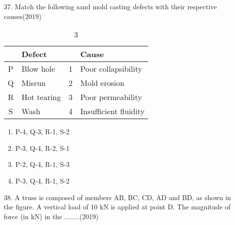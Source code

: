 \documentclass[journal]{IEEEtran}
\begin{document}
\begin{enumerate}
\begin{enumerate}[label=(\Alph*)]
    \end{enumerate}
    \item[37.] Match the following sand mold casting defects with their respective causes\hfill (2019)
    \begin{table}[!ht]
        \centering
        \begin{tabular}{|c|l|c|l|}
            \hline
            \textbf{} & \textbf{Defect} & \textbf{} & \textbf{Cause} \\
            \hline
            P & Blow hole & 1 & Poor collapsibility \\
            Q & Misrun & 2 & Mold erosion \\
            R & Hot tearing & 3 & Poor permeability \\
            S & Wash & 4 & Insufficient fluidity \\
            \hline
        \end{tabular} %
        \caption{3}
    \end{table}
    \begin{enumerate}[label=(\Alph*)]
        \item P-4, Q-3, R-1, S-2
        \item P-3, Q-4, R-2, S-1
        \item P-2, Q-4, R-1, S-3
        \item P-3, Q-4, R-1, S-2
    \end{enumerate}
    \item[38.] A truss is composed of members AB, BC, CD, AD and BD, as shown in the figure. A vertical load of 10 kN is applied at point D. The magnitude of force (in kN) in the ........\hfill (2019)
    \begin{figure}[!ht]
        \centering
\end{figure}
\end{enumerate}
\end{document}
